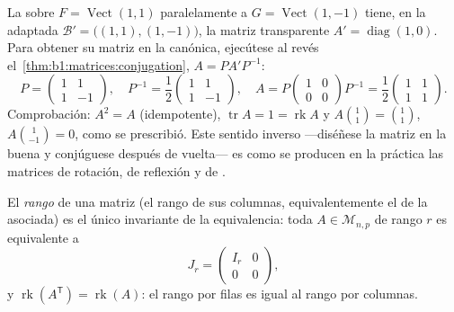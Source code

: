 \begin{example}
\label{ex:b1:matrices:reverserun}
La  sobre $F = \operatorname{Vect}(1,1)$ paralelamente a
$G = \operatorname{Vect}(1,-1)$ tiene, en la  adaptada
$\mathcal B' = \bigl((1,1),(1,-1)\bigr)$, la matriz transparente
$A' = \operatorname{diag}(1, 0)$. Para obtener su matriz en la
 canónica, ejecútese al revés
el~\cref{thm:b1:matrices:conjugation}, $A = P A' P^{-1}$:
\[
P = \begin{pmatrix} 1 & 1\\ 1 & -1\end{pmatrix},
\quad
P^{-1} = \frac12\begin{pmatrix} 1 & 1\\ 1 & -1\end{pmatrix},
\quad
A = P\begin{pmatrix} 1 & 0\\ 0 & 0\end{pmatrix}P^{-1}
= \frac12\begin{pmatrix} 1 & 1\\ 1 & 1\end{pmatrix}.
\]
Comprobación: $A^2 = A$ (idempotente),
$\operatorname{tr} A = 1 = \operatorname{rk} A$ y
$A\binom{1}{1} = \binom11$, $A\binom{1}{-1} = 0$, como se prescribió.
Este sentido inverso ---diséñese la matriz en la  buena y
conjúguese después de vuelta--- es como se producen en la práctica
las matrices de rotación, de reflexión y de .
\end{example}

\begin{theorem}\label{thm:b1:matrices:rank}
El \emph{rango} de una matriz (el rango de sus columnas,
equivalentemente el de la  asociada) es el único
invariante de la equivalencia: toda $A \in \mathcal{M}_{n,p}$ de
rango $r$ es equivalente a
\[
J_r = \begin{pmatrix} I_r & 0 \\ 0 & 0 \end{pmatrix},
\]
y $\operatorname{rk}(A^{\mathsf T}) = \operatorname{rk}(A)$: el rango
por filas es igual al rango por columnas.
\end{theorem}

